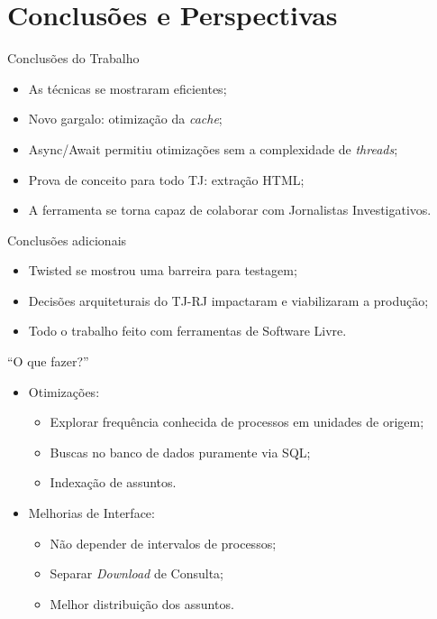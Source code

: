 \section{Conclusões e Perspectivas}

\begin{frame}{Conclusões do Trabalho}
    \begin{itemize}
        \item As técnicas se mostraram eficientes;
        \item Novo gargalo: otimização da \textit{cache};
        \item Async/Await permitiu otimizações sem a complexidade de
            \textit{threads};
        \item Prova de conceito para todo TJ: extração HTML;
        \item A ferramenta se torna capaz de colaborar com Jornalistas
            Investigativos.
    \end{itemize}
\end{frame}

\begin{frame}{Conclusões adicionais}
    \begin{itemize}
        \item Twisted se mostrou uma barreira para testagem;
        \item Decisões arquiteturais do TJ-RJ impactaram e viabilizaram a
            produção;
        \item Todo o trabalho feito com ferramentas de Software Livre.
    \end{itemize}
\end{frame}

\begin{frame}{``O que fazer?''}
    \begin{itemize}
        \item Otimizações:
            \begin{itemize}
                \item Explorar frequência conhecida de processos em unidades de origem;
                \item Buscas no banco de dados puramente via SQL;
                \item Indexação de assuntos.
            \end{itemize}
        \item Melhorias de Interface:
            \begin{itemize}
                \item Não depender de intervalos de processos;
                \item Separar \textit{Download} de Consulta;
                \item Melhor distribuição dos assuntos.
            \end{itemize}
    \end{itemize}
\end{frame}

